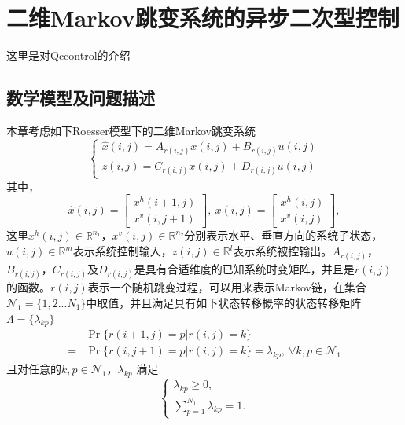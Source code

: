 
\chapter{二维Markov跳变系统的异步二次型控制}
这里是对Qccontrol的介绍

\section{数学模型及问题描述}
	本章考虑如下Roesser模型下的二维Markov跳变系统
	\begin{equation} \label{qc-system-equation}
	\left\{
	\begin{array}{lr}
	\hat{x}(i,j) = A_{r(i,j)}x(i,j)+B_{r(i,j)}u(i,j) \\
	z(i,j) = C_{r(i,j)}x(i,j)+D_{r(i,j)}u(i,j)
	\end{array}
	\right.
	\end{equation}
	其中，
	\begin{equation*}
	\hat{x}(i,j) = \begin{bmatrix}
	x^{h}(i+1,j) \\
	x^{v}(i,j+1)
	\end{bmatrix}, \
	x(i, j) = \begin{bmatrix}
	x^{h}(i,j) \\
	x^{v}(i,j)
	\end{bmatrix},
	\end{equation*}
	这里$x^{h}(i,j)\in\mathbb{R}^{n_1}$，$x^{v}(i,j)\in\mathbb{R}^{n_2}$分别表示水平、垂直方向的系统子状态，$u(i,j)\in\mathbb{R}^{m}$表示系统控制输入，$z(i,j)\in\mathbb{R}^{l}$表示系统被控输出。$A_{r(i,j)}$，$B_{r(i,j)}$，$C_{r(i,j)}$及$D_{r(i,j)}$是具有合适维度的已知系统时变矩阵，并且是$r(i,j)$的函数。$r(i,j)$表示一个随机跳变过程，可以用来表示Markov链，在集合$\mathcal{N}_{1} = \{1,2...N_{1}\}$中取值，并且满足具有如下状态转移概率的状态转移矩阵$\varLambda = \{\lambda_{kp}\}$
	\begin{equation}\label{qc-tps-system}
	\begin{split}
	&\Pr\{r(i+1,j)=p|r(i,j)=k\}\\
	=&\Pr\{r(i,j+1)=p|r(i,j)=k\}=\lambda_{kp},\  \forall k,p \in \mathcal{N}_{1}
	\end{split}
	\end{equation}
	且对任意的$k, p\in\mathcal{N}_{1}$，$\lambda_{kp}$ 满足
	\begin{equation}
	\left\{
	\begin{array}{lr}
	\lambda_{kp} \geq 0, \\
	\sum_{p=1}^{N_1}\lambda_{kp}=1.
	\end{array}
	\right.
	\end{equation}
	
